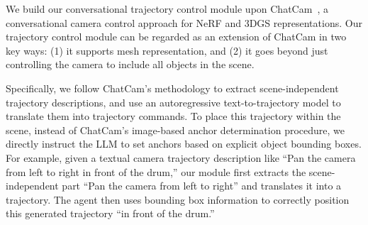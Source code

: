 We build our conversational trajectory control module upon ChatCam~\cite{liu2024chatcam}, a conversational camera control approach for NeRF and 3DGS representations. Our trajectory control module can be regarded as an extension of ChatCam in two key ways: (1) it supports mesh representation, and (2) it goes beyond just controlling the camera to include all objects in the scene.

Specifically, we follow ChatCam's methodology to extract scene-independent trajectory descriptions, and use an autoregressive text-to-trajectory model to translate them into trajectory commands. To place this trajectory within the scene, instead of ChatCam's image-based anchor determination procedure, we directly instruct the LLM to set anchors based on explicit object bounding boxes. 
%
For example, given a textual camera trajectory description like ``Pan the camera from left to right in front of the drum,'' our module first extracts the scene-independent part ``Pan the camera from left to right'' and translates it into a trajectory. The agent then uses bounding box information to correctly position this generated trajectory ``in front of the drum.''


